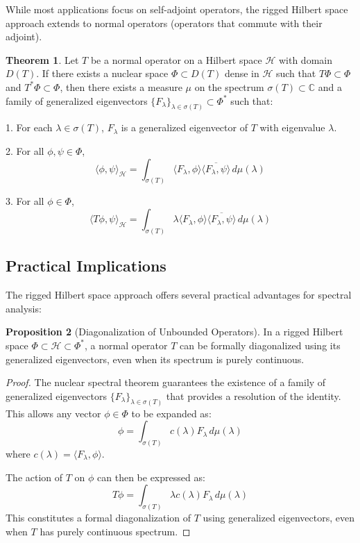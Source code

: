 \documentclass[12pt,a4paper]{article}
\theoremstyle{definition}
\newtheorem{theorem}{Theorem}
\newtheorem{proposition}[theorem]{Proposition}
\begin{document}
While most applications focus on self-adjoint operators, the rigged Hilbert space approach extends to normal operators (operators that commute with their adjoint).

\begin{theorem}
Let $T$ be a normal operator on a Hilbert space $\mathcal{H}$ with domain $D(T)$. If there exists a nuclear space $\Phi \subset D(T)$ dense in $\mathcal{H}$ such that $T\Phi \subset \Phi$ and $T^*\Phi \subset \Phi$, then there exists a measure $\mu$ on the spectrum $\sigma(T) \subset \mathbb{C}$ and a family of generalized eigenvectors $\{F_\lambda\}_{\lambda \in \sigma(T)} \subset \Phi^*$ such that:

1. For each $\lambda \in \sigma(T)$, $F_\lambda$ is a generalized eigenvector of $T$ with eigenvalue $\lambda$.

2. For all $\phi, \psi \in \Phi$,
\begin{equation}
    \langle \phi, \psi \rangle_{\mathcal{H}} = \int_{\sigma(T)} \langle F_\lambda, \phi \rangle \overline{\langle F_\lambda, \psi \rangle} \, d\mu(\lambda)
\end{equation}

3. For all $\phi \in \Phi$,
\begin{equation}
    \langle T\phi, \psi \rangle_{\mathcal{H}} = \int_{\sigma(T)} \lambda \langle F_\lambda, \phi \rangle \overline{\langle F_\lambda, \psi \rangle} \, d\mu(\lambda)
\end{equation}
\end{theorem}

\subsection{Practical Implications}

The rigged Hilbert space approach offers several practical advantages for spectral analysis:

\begin{proposition}[Diagonalization of Unbounded Operators]
In a rigged Hilbert space $\Phi \subset \mathcal{H} \subset \Phi^*$, a normal operator $T$ can be formally diagonalized using its generalized eigenvectors, even when its spectrum is purely continuous.
\end{proposition}

\begin{proof}
The nuclear spectral theorem guarantees the existence of a family of generalized eigenvectors $\{F_\lambda\}_{\lambda \in \sigma(T)}$ that provides a resolution of the identity. This allows any vector $\phi \in \Phi$ to be expanded as:
\begin{equation}
    \phi = \int_{\sigma(T)} c(\lambda) F_\lambda \, d\mu(\lambda)
\end{equation}
where $c(\lambda) = \langle F_\lambda, \phi \rangle$.

The action of $T$ on $\phi$ can then be expressed as:
\begin{equation}
    T\phi = \int_{\sigma(T)} \lambda c(\lambda) F_\lambda \, d\mu(\lambda)
\end{equation}
This constitutes a formal diagonalization of $T$ using generalized eigenvectors, even when $T$ has purely continuous spectrum.
\end{proof}
\end{document}
